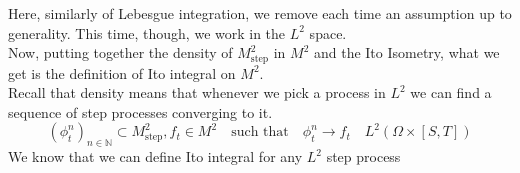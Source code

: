 Here, similarly of Lebesgue integration, we remove each time an assumption up to generality. This time, though, we work in the $L^2$ space. \\
Now, putting together the density of $M^2_{\text{step}}$ in $M^2$ and the Ito Isometry, what we get is the definition of Ito integral on $M^2$. \\
Recall that density means that whenever we pick a process in $L^2$ we can find a sequence of step processes converging to it. 
\begin{equation*}
    (\phi_t^n)_{n \in \mathbb{N}} \subset M^2_{\text{step}}, f_t \in M^2 \quad \text{such that} \quad \phi_t^n \rightarrow f_t \quad L^2(\Omega \times [S,T])
\end{equation*}
We know that we can define Ito integral for any $L^2$ step process \\


